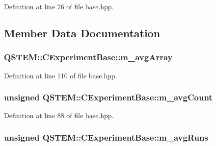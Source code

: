 Definition at line 76 of file base.\-hpp.



\subsection{Member Data Documentation}
\hypertarget{class_q_s_t_e_m_1_1_c_experiment_base_ad2564b3cc6ecfdc01974099f2447edfb}{
\subsubsection[{m\-\_\-avg\-Array}]{ Q\-S\-T\-E\-M\-::\-C\-Experiment\-Base\-::m\-\_\-avg\-Array\hspace{0.3cm}{\ttfamily [protected]}}}\label{class_q_s_t_e_m_1_1_c_experiment_base_ad2564b3cc6ecfdc01974099f2447edfb}


Definition at line 110 of file base.\-hpp.

\hypertarget{class_q_s_t_e_m_1_1_c_experiment_base_a42472805cae3d7c91c0411cef287efd1}{
\subsubsection[{m\-\_\-avg\-Count}]{\setlength{\rightskip}{0pt plus 5cm}unsigned Q\-S\-T\-E\-M\-::\-C\-Experiment\-Base\-::m\-\_\-avg\-Count\hspace{0.3cm}{\ttfamily [protected]}}}\label{class_q_s_t_e_m_1_1_c_experiment_base_a42472805cae3d7c91c0411cef287efd1}


Definition at line 88 of file base.\-hpp.

\hypertarget{class_q_s_t_e_m_1_1_c_experiment_base_acc50aeea50f3aa528fd6ad33ed224559}{
\subsubsection[{m\-\_\-avg\-Runs}]{\setlength{\rightskip}{0pt plus 5cm}unsigned Q\-S\-T\-E\-M\-::\-C\-Experiment\-Base\-::m\-\_\-avg\-Runs\hspace{0.3cm}{\ttfamily [protected]}}}\label{class_q_s_t_e_m_1_1_c_experiment_base_acc50aeea50f3aa528fd6ad33ed224559}


